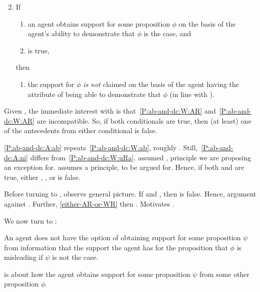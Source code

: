 \begin{note}[Conditional B]
  \begin{proposition}[\mcB{}]
    \begin{enumerate}[label=(C\Alph*), ref=(C\Alph*)]
      \setcounter{enumi}{1}
    \item\label{P:ab-and-dc:A} If
      \begin{enumerate}[label=(\roman*), ref=(CB.\roman*)]
      \item\label{P:ab-and-dc:A:ab} an agent obtains support for some proposition \(\phi\) on the basis of the agent's ability to demonstrate that \(\phi\) is the case, and
      \item\label{P:ab-and-dc:A:ni} \nI{} is true,
      \end{enumerate}
      then
      \begin{enumerate}[label=(\roman*), ref=(CB.\roman*), resume]
      \item\label{P:ab-and-dc:A:AR} the support for \(\phi\) \emph{is not} claimed on the basis of the agent having the attribute of being able to demonstrate that \(\phi\) (in line with \AR{}).
      \end{enumerate}
    \end{enumerate}
  \end{proposition}

  Given \mcA{}, the immediate interest with \mcB{} is that~\ref{P:ab-and-dc:W:AR} and~\ref{P:ab-and-dc:W:AR} are incompatible.
  So, if both conditionals are true, then (at least) one of the antecedents from either conditional is false.

  \ref{P:ab-and-dc:A:ab} repeats~\ref{P:ab-and-dc:W:ab}, roughly \eA{}.
  Still,~\ref{P:ab-and-dc:A:ni} differs from~\ref{P:ab-and-dc:W:uRa}.
  \mcA{} assumed \uRa{}, principle we are proposing an exception for.
  \mcB{} assumes a principle, \nI{} to be argued for.
  Hence, if both \mcA{} and \mcB{} are true, either \eA{}, \mp{}, or \nI{} is false.

  Before turning to \nI{}, observe general picture.
  If \eA{} and \nI{}, then \uRa{} is false.
  Hence, argument against \uRa{}.
  Further, \ref{either-AR-or-WR} then \WR{}.
  Motivates \rC{}.
\end{note}

\begin{note}[Inertia]
  We now turn to \nI{}:
  \begin{proposition}[\nI{}]\label{prem:ni}
    An agent does not have the option of obtaining support for some proposition \(\psi\) from information that the support the agent has for the proposition that \(\phi\) is misleading if \(\psi\) is not the case.
  \end{proposition}

  \nI{} is about how the agent obtains support for some proposition \(\psi\) from some other proposition \(\phi\).
\end{note}

